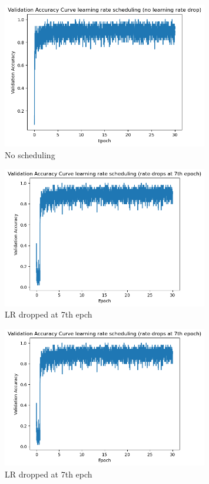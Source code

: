 \documentclass{assignment}
\begin{document}
\begin{figure}[htbp!]
    \centering
    \includegraphics[width=0.8\textwidth]{figures/part5_cnn_3_scheduled_1.png}
    \caption{No scheduling}
    \label{fig:q5_sch_1}
\end{figure}

\begin{figure}[htbp!]
    \centering
    \includegraphics[width=0.8\textwidth]{figures/part5_cnn_3_scheduled_2.png}
    \caption{LR dropped at 7th epch}
    \label{fig:q5_sch_2}
\end{figure}
\begin{figure}[htbp!]
    \centering
    \includegraphics[width=0.8\textwidth]{figures/part5_cnn_3_scheduled_2.png}
    \caption{LR dropped at 7th epch}
    \label{fig:q5_sch_3}
\end{figure}
\end{document}
